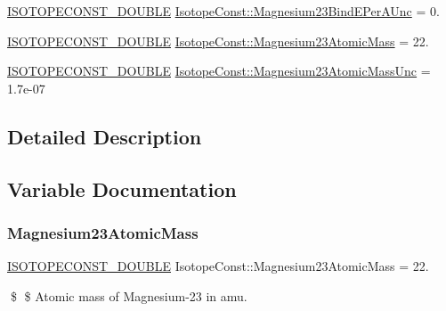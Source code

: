 \begin{DoxyCompactItemize}
\mbox{\hyperlink{group___isotope_const-_macros_ga8f45a7272ce02c0b4c65c44636ed719a}{I\+S\+O\+T\+O\+P\+E\+C\+O\+N\+S\+T\+\_\+\+D\+O\+U\+B\+LE}} \mbox{\hyperlink{group___isotope_const-_magnesium-_mg23_gac67f98e560283ea6b0f34654fd58820b}{Isotope\+Const\+::\+Magnesium23\+Bind\+E\+Per\+A\+Unc}} = 0.
\item 
\mbox{\hyperlink{group___isotope_const-_macros_ga8f45a7272ce02c0b4c65c44636ed719a}{I\+S\+O\+T\+O\+P\+E\+C\+O\+N\+S\+T\+\_\+\+D\+O\+U\+B\+LE}} \mbox{\hyperlink{group___isotope_const-_magnesium-_mg23_gabe7099b54df43381d88ab85350150d7d}{Isotope\+Const\+::\+Magnesium23\+Atomic\+Mass}} = 22.
\item 
\mbox{\hyperlink{group___isotope_const-_macros_ga8f45a7272ce02c0b4c65c44636ed719a}{I\+S\+O\+T\+O\+P\+E\+C\+O\+N\+S\+T\+\_\+\+D\+O\+U\+B\+LE}} \mbox{\hyperlink{group___isotope_const-_magnesium-_mg23_ga2baa7d511b72b70e33c794a9608824e4}{Isotope\+Const\+::\+Magnesium23\+Atomic\+Mass\+Unc}} = 1.\+7e-\/07
\end{DoxyCompactItemize}


\subsection{Detailed Description}


\subsection{Variable Documentation}
\mbox{\label{group___isotope_const-_magnesium-_mg23_gabe7099b54df43381d88ab85350150d7d}} 
\subsubsection{\texorpdfstring{Magnesium23\+Atomic\+Mass}{Magnesium23AtomicMass}}
{\footnotesize\ttfamily \mbox{\hyperlink{group___isotope_const-_macros_ga8f45a7272ce02c0b4c65c44636ed719a}{I\+S\+O\+T\+O\+P\+E\+C\+O\+N\+S\+T\+\_\+\+D\+O\+U\+B\+LE}} Isotope\+Const\+::\+Magnesium23\+Atomic\+Mass = 22.}

\$ \$ Atomic mass of Magnesium-\/23 in amu. \mbox{\label{group___isotope_const-_magnesium-_mg23_ga2baa7d511b72b70e33c794a9608824e4}} 
